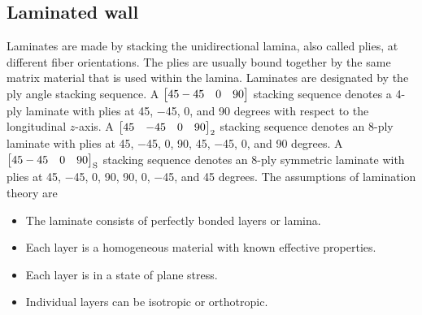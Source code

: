\documentclass{AeroStructure-ERJohnson}
\begin{document}
\vspace*{-1pc}

\subsection{Laminated wall}\label{sec8.1.5}

Laminates are made by stacking the unidirectional lamina, also
called plies, at different fiber orientations. The plies are
usually bound together by the same matrix material that is used
within the lamina. Laminates are designated by the ply angle
stacking sequence. A ${\left[\begin{array}{@{}lll@{}} 45-45 & 0 & 90 \end{array}\right]}$ stacking sequence denotes a 4-ply laminate with
plies at 45, $-$45, 0, and 90 degrees with respect to the
longitudinal $z$-axis. A $\left[\begin{array}{@{}llll@{}} 45 & -45 & 0 &
90 \end{array}\right]_{2} $ stacking sequence denotes an 8-ply
laminate with plies at 45, $-$45, 0, 90, 45, $-$45, 0, and 90
degrees. A $ \left[\begin{array}{@{}lll@{}} 45-45 & 0 & 90
\end{array}\right]_{\mathrm{S}}$ stacking sequence denotes an
8-ply symmetric laminate with plies at 45, $-$45, 0, 90, 90, 0,
$-$45, and 45 degrees. The assumptions of lamination theory are
\begin{itemize}
\item The laminate consists of perfectly bonded layers or lamina.
\item Each layer is a homogeneous material with known effective
properties.
\item Each layer is in a state of plane stress.
\item Individual layers can be isotropic or orthotropic.
\end{itemize}
\end{document}
